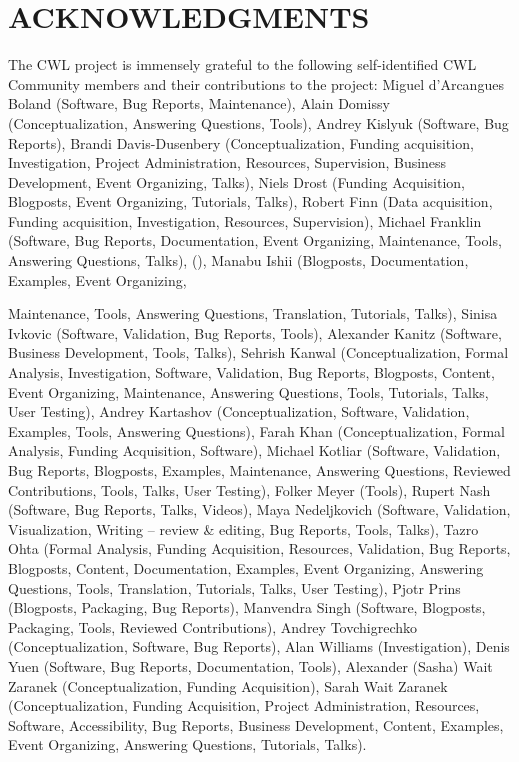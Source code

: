 \documentclass[
]{article}
\begin{document}
\section{ACKNOWLEDGMENTS}\label{acknowledgments}

The CWL project is immensely grateful to the following self-identified
CWL Community members and their contributions to the project: Miguel
d'Arcangues Boland (Software, Bug Reports, Maintenance), Alain Domissy
(Conceptualization, Answering Questions, Tools), Andrey Kislyuk
(Software, Bug Reports), Brandi Davis-Dusenbery (Conceptualization,
Funding acquisition, Investigation, Project Administration, Resources,
Supervision, Business Development, Event Organizing, Talks), Niels Drost
(Funding Acquisition, Blogposts, Event Organizing, Tutorials, Talks),
Robert Finn (Data acquisition, Funding acquisition, Investigation,
Resources, Supervision), Michael Franklin (Software, Bug Reports,
Documentation, Event Organizing, Maintenance, Tools, Answering
Questions, Talks), (), Manabu Ishii (Blogposts, Documentation, Examples,
Event Organizing,

Maintenance, Tools, Answering Questions, Translation, Tutorials, Talks),
Sinisa Ivkovic (Software, Validation, Bug Reports, Tools), Alexander
Kanitz (Software, Business Development, Tools, Talks), Sehrish Kanwal
(Conceptualization, Formal Analysis, Investigation, Software,
Validation, Bug Reports, Blogposts, Content, Event Organizing,
Maintenance, Answering Questions, Tools, Tutorials, Talks, User
Testing), Andrey Kartashov (Conceptualization, Software, Validation,
Examples, Tools, Answering Questions), Farah Khan (Conceptualization,
Formal Analysis, Funding Acquisition, Software), Michael Kotliar
(Software, Validation, Bug Reports, Blogposts, Examples, Maintenance,
Answering Questions, Reviewed Contributions, Tools, Talks, User
Testing), Folker Meyer (Tools), Rupert Nash (Software, Bug Reports,
Talks, Videos), Maya Nedeljkovich (Software, Validation, Visualization,
Writing -- review \& editing, Bug Reports, Tools, Talks), Tazro Ohta
(Formal Analysis, Funding Acquisition, Resources, Validation, Bug
Reports, Blogposts, Content, Documentation, Examples, Event Organizing,
Answering Questions, Tools, Translation, Tutorials, Talks, User
Testing), Pjotr Prins (Blogposts, Packaging, Bug Reports), Manvendra
Singh (Software, Blogposts, Packaging, Tools, Reviewed Contributions),
Andrey Tovchigrechko (Conceptualization, Software, Bug Reports), Alan
Williams (Investigation), Denis Yuen (Software, Bug Reports,
Documentation, Tools), Alexander (Sasha) Wait Zaranek
(Conceptualization, Funding Acquisition), Sarah Wait Zaranek
(Conceptualization, Funding Acquisition, Project Administration,
Resources, Software, Accessibility, Bug Reports, Business Development,
Content, Examples, Event Organizing, Answering Questions, Tutorials,
Talks).
\end{document}
